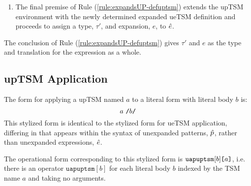 {{{{\begin{enumerate}
\item 
The final premise of Rule (\ref{rule:expandsUP-defuptsm}) extends the upTSM environment with the newly determined expanded ueTSM definition and proceeds to assign a type, $\tau'$, and expansion, $e$, to $\hat{e}$.
\end{enumerate}
The conclusion of Rule (\ref{rule:expandsUP-defuptsm}) gives $\tau'$ and $e$ as the type and translation for the expression as a whole.
\subsection{upTSM Application}
The form for applying a upTSM named $a$ to a literal form with literal body $b$ is:
\[
a~\texttt{/}b\texttt{/}
\] 
This stylized form is identical to the stylized form for ueTSM application, differing in that appears within the syntax of unexpanded patterns, $\hat{p}$, rather than unexpanded expressions, $\hat{e}$. %

The operational form corresponding to this stylized form is $\texttt{uapuptsm}[b]\texttt{[}a\texttt{]}$, i.e. there is an operator $\texttt{uapuptsm}[b]$ for each literal body $b$ indexed by the TSM name $a$ and taking no arguments.

}}}}
